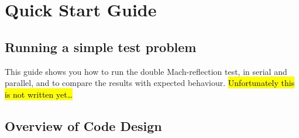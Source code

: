 \documentclass[a4paper,11pt]{report}
\begin{document}
\newpage
{}
\tableofcontents
\newpage


\chapter{Quick Start Guide}

\section{Running a simple test problem}
This guide shows you how to run the double Mach-reflection test, in serial and parallel, and to compare the results with expected behaviour.
\hl{Unfortunately this is not written yet\ldots}

\section{Overview of Code Design}

\end{document}
